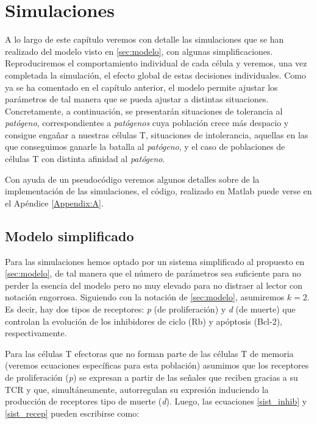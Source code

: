 
\chapter{Simulaciones}
\label{cap:simulaciones}

A lo largo de este capítulo veremos con detalle las simulaciones que se han realizado del modelo visto en \ref{sec:modelo}, con algunas simplificaciones. Reproduciremos el comportamiento individual de cada célula y veremos, una vez completada la simulación, el efecto global de estas decisiones individuales. Como ya se ha comentado en el capítulo anterior, el modelo permite ajustar los parámetros de tal manera que se pueda ajustar a distintas situaciones. Concretamente, a continuación, se presentarán situaciones de tolerancia al \textit{patógeno}, correspondientes a \textit{patógenos} cuya población crece más despacio y consigue engañar a nuestras células T, situaciones de intolerancia, aquellas en las que conseguimos ganarle la batalla al \textit{patógeno}, y el caso de poblaciones de células T con distinta afinidad al \textit{patógeno}.

Con ayuda de un pseudocódigo veremos algunos detalles sobre de la implementación de las simulaciones, el código, realizado en Matlab puede verse en el Apéndice \ref{Appendix:A}.


\section{Modelo simplificado}

Para las simulaciones hemos optado por un sistema simplificado al propuesto en \ref{sec:modelo}, de tal manera que el número de parámetros sea suficiente para no perder la esencia del modelo pero no muy elevado para no distraer al lector con notación engorrosa. Siguiendo con la notación de \ref{sec:modelo}, asumiremos $k=2$. Es decir, hay dos tipos de receptores: \textit{p} (de proliferación) y \textit{d} (de muerte) que controlan
la evolución de los inhibidores de ciclo (Rb) y apóptosis (Bcl-2), respectivamente.

Para las células T efectoras que no forman parte de las células T de memoria (veremos ecuaciones específicas para esta población) asumimos que los receptores de proliferación (\textit{p}) se expresan a partir de las señales que reciben gracias a su TCR y que, simultáneamente, autorregulan su expresión induciendo la producción de receptores tipo de muerte (\textit{d}). Luego, las ecuaciones \ref{sist_inhib} y \ref{sist_recep} pueden escribirse como:

